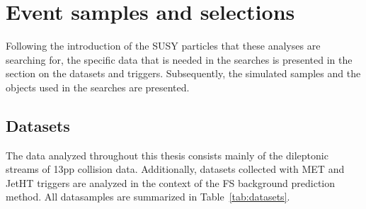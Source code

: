 \chapter{Event samples and selections}
Following the introduction of the SUSY particles that these analyses are searching for, the specific data that is needed in the searches is presented in the section on the datasets and triggers. 
Subsequently, the simulated samples and the objects used in the searches are presented.  
  
\section{Datasets}
\label{sec:samplesObjects}

The data analyzed throughout this thesis consists mainly of the dileptonic streams of 13\TeV pp collision data.  
Additionally, datasets collected with MET and JetHT triggers are analyzed in the context of the FS background prediction method.
All datasamples are summarized in Table~\ref{tab:datasets}.  

